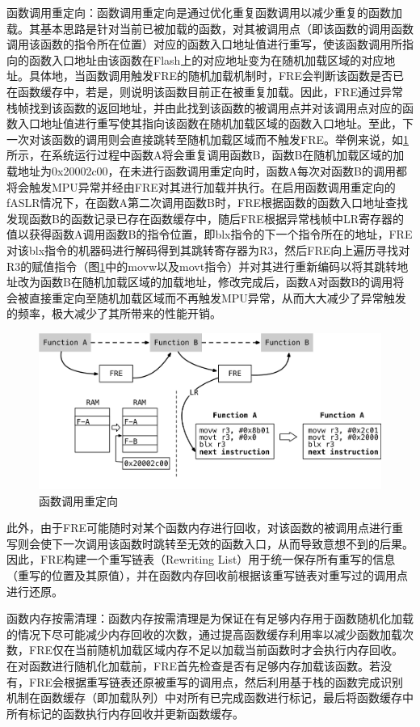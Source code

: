 \documentclass[UTF8,12pt,a4paper]{ctexart}
\numberwithin{figure}{section}
\begin{document}
\par 函数调用重定向：函数调用重定向是通过优化重复函数调用以减少重复的函数加载。其基本思路是针对当前已被加载的函数，对其被调用点（即该函数的调用函数调用该函数的指令所在位置）对应的函数入口地址值进行重写，使该函数调用所指向的函数入口地址由该函数在Flash上的对应地址变为在随机加载区域的对应地址。具体地，当函数调用触发FRE的随机加载机制时，FRE会判断该函数是否已在函数缓存中，若是，则说明该函数目前正在被重复加载。因此，FRE通过异常栈帧找到该函数的返回地址，并由此找到该函数的被调用点并对该调用点对应的函数入口地址值进行重写使其指向该函数在随机加载区域的函数入口地址。至此，下一次对该函数的调用则会直接跳转至随机加载区域而不触发FRE。举例来说，如\ref{fig:redirection}所示，在系统运行过程中函数A将会重复调用函数B，函数B在随机加载区域的加载地址为0x20002c00，在未进行函数调用重定向时，函数A每次对函数B的调用都将会触发MPU异常并经由FRE对其进行加载并执行。在启用函数调用重定向的fASLR情况下，在函数A第二次调用函数B时，FRE根据函数的函数入口地址查找发现函数B的函数记录已存在函数缓存中，随后FRE根据异常栈帧中LR寄存器的值以获得函数A调用函数B的指令位置，即blx指令的下一个指令所在的地址，FRE对该blx指令的机器码进行解码得到其跳转寄存器为R3，然后FRE向上遍历寻找对R3的赋值指令（图\ref{fig:redirection}中的movw以及movt指令）并对其进行重新编码以将其跳转地址改为函数B在随机加载区域的加载地址，修改完成后，函数A对函数B的调用将会被直接重定向至随机加载区域而不再触发MPU异常，从而大大减少了异常触发的频率，极大减少了其所带来的性能开销。
\begin{figure}[H]
    \centering
    \includegraphics[scale=0.5]{graph/redirection.png}
    \caption{函数调用重定向}
    \label{fig:redirection}
\end{figure}
\par 此外，由于FRE可能随时对某个函数内存进行回收，对该函数的被调用点进行重写则会使下一次调用该函数时跳转至无效的函数入口，从而导致意想不到的后果。因此，FRE构建一个重写链表（Rewriting List）用于统一保存所有重写的信息（重写的位置及其原值），并在函数内存回收前根据该重写链表对重写过的调用点进行还原。
\par 函数内存按需清理：函数内存按需清理是为保证在有足够内存用于函数随机化加载的情况下尽可能减少内存回收的次数，通过提高函数缓存利用率以减少函数加载次数，FRE仅在当前随机加载区域内存不足以加载当前函数时才会执行内存回收。在对函数进行随机化加载前，FRE首先检查是否有足够内存加载该函数。若没有，FRE会根据重写链表还原被重写的调用点，然后利用基于栈的函数完成识别机制在函数缓存（即加载队列）中对所有已完成函数进行标记，最后将函数缓存中所有标记的函数执行内存回收并更新函数缓存。
\end{document}

